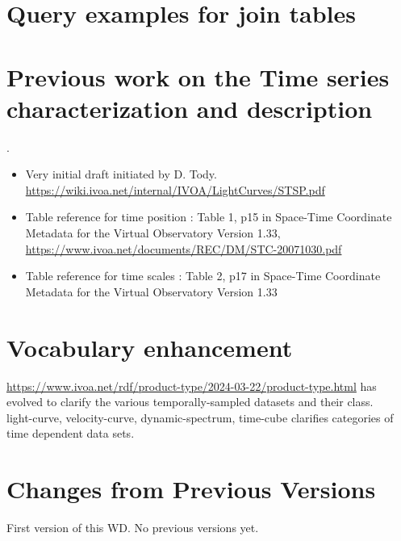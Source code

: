\documentclass[11pt,a4paper]{ivoa}
\begin{document}





\appendix



\section{Query examples for join tables}\label{sec:query_examples}



\section{Previous work on the Time series characterization and description}.

\begin{itemize}
\item Very initial draft initiated by D. Tody. \url{https://wiki.ivoa.net/internal/IVOA/LightCurves/STSP.pdf}
\item Table reference for time position : Table 1, p15 in Space-Time Coordinate Metadata for the Virtual Observatory
Version 1.33, \url{https://www.ivoa.net/documents/REC/DM/STC-20071030.pdf}
\item Table reference for time scales :  Table 2, p17 in Space-Time Coordinate Metadata for the Virtual Observatory
Version 1.33
\end{itemize}

\section{Vocabulary enhancement}
 \url{https://www.ivoa.net/rdf/product-type/2024-03-22/product-type.html}
has evolved to clarify the various temporally-sampled datasets and their class.\\
light-curve, velocity-curve, dynamic-spectrum, time-cube clarifies categories of time dependent data sets.

\section{Changes from Previous Versions}

First version of this WD.
No previous versions yet.
\end{document}
